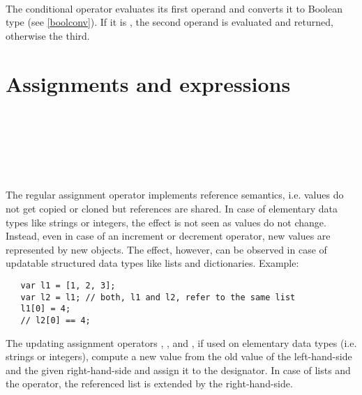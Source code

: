 \begin{grammar}
      \produces {} \\
      \produces {} 
          \lextoken{:}
\end{grammar}

\noindent
The conditional operator  evaluates its first operand
and converts it to Boolean type (see \ref{boolconv}). If it
is , the second operand is evaluated and returned,
otherwise the third.

\section{Assignments and expressions}\label{assignments}

\begin{grammar}
      \produces {} \\
      \produces {} \lextoken{=}
          \\
      \produces {} \lextoken{\&=}
          \\
      \produces {} \lextoken{+=}
          \\
      \produces {} \lextoken{-=}
          \\
      \produces {}
\end{grammar}

\noindent
The regular assignment operator \token{=} implements reference semantics,
i.e. values do not get copied or cloned but references are shared. In
case of elementary data types like strings or integers, the effect is
not seen as values do not change. Instead, even in case of an increment
or decrement operator, new values are represented by new objects. The
effect, however, can be observed in case of updatable structured data types
like lists and dictionaries. Example:

\begin{lstlisting}
   var l1 = [1, 2, 3];
   var l2 = l1; // both, l1 and l2, refer to the same list
   l1[0] = 4;
   // l2[0] == 4;
\end{lstlisting}

\noindent
The updating assignment operators \token{\&=}, \token{+=}, and \token{-=},
if used on elementary data types (i.e. strings or integers),
compute a new value from the old value of the left-hand-side
and the given right-hand-side and assign it to the designator.
In case of lists and the \token{\&=} operator, the referenced list
is extended by the right-hand-side.

